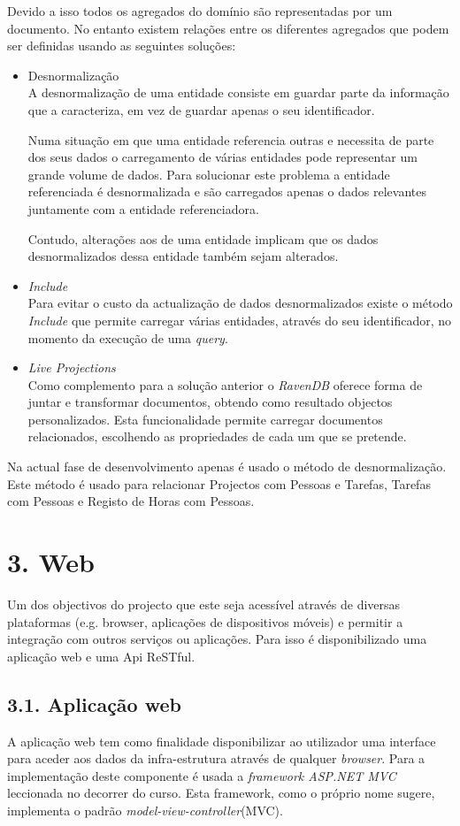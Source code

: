 \documentclass[]{article}
\begin{document}
Devido a isso todos os agregados do domínio são representadas por um documento. No entanto existem relações entre os diferentes agregados que podem ser definidas usando as seguintes soluções:
\begin{itemize}
\item{Desnormalização}\\
A desnormalização de uma entidade consiste em guardar parte da informação que a caracteriza, em vez de guardar apenas o seu identificador. 

Numa situação em que uma entidade referencia outras e necessita de parte dos seus dados o carregamento de várias entidades pode representar um grande volume de dados. Para solucionar este problema a entidade referenciada é desnormalizada e são carregados apenas o dados relevantes juntamente com a entidade referenciadora.

Contudo, alterações aos de uma entidade implicam que os dados desnormalizados dessa entidade também sejam alterados.
\item{\emph{Include}}\\

Para evitar o custo da actualização de dados desnormalizados existe o método \emph{Include} que permite carregar várias entidades, através do seu identificador, no momento da execução de uma \emph{query}.
\item{\emph{Live Projections}}\\

Como complemento para a solução anterior o \emph{RavenDB}\cite{ravendb} oferece forma de juntar e transformar documentos, obtendo como resultado objectos personalizados. Esta funcionalidade permite carregar documentos relacionados, escolhendo as propriedades de cada um que se pretende.
\end{itemize}
Na actual fase de desenvolvimento apenas é usado o método de desnormalização. Este método é usado para relacionar Projectos com Pessoas e Tarefas, Tarefas com Pessoas e Registo de Horas com Pessoas.

\section{3. Web}
Um dos objectivos do projecto que este seja acessível através de diversas plataformas (e.g. browser, aplicações de dispositivos móveis) e permitir a integração com outros serviços ou aplicações. Para isso é disponibilizado uma aplicação web e uma Api ReSTful. 

\subsection{3.1. Aplicação web}
A aplicação web tem como finalidade disponibilizar ao utilizador uma interface para aceder aos dados da infra-estrutura através de qualquer \emph{browser}. Para a implementação deste componente é usada a \emph{framework ASP.NET MVC}\cite{aspnetmvc} leccionada no decorrer do curso. Esta framework, como o próprio nome sugere, implementa o padrão \emph{model-view-controller}(MVC).
\end{document}
